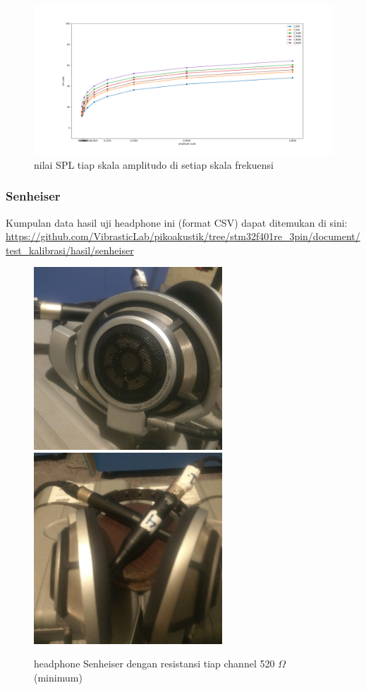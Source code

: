 \documentclass[12pt,]{article}
\begin{document}
	\begin{figure}[!ht]
		\centering
		\includegraphics[width=500pt]{hasil/kenion/maxallfreq/each_freq}
		\caption{nilai SPL tiap skala amplitudo di setiap skala frekuensi}
	\end{figure}

	\subsubsection{Senheiser}
	
	Kumpulan data hasil uji headphone ini (format CSV) dapat ditemukan di sini:\\
	\url{https://github.com/VibrasticLab/pikoakustik/tree/stm32f401re_3pin/document/test_kalibrasi/hasil/senheiser}
	
	\begin{figure}[!ht]
		\centering
		\includegraphics[width=200pt]{hasil/senheiser/senheiser}
		\includegraphics[width=200pt]{hasil/senheiser/senheiser_setup}
		\caption{headphone Senheiser dengan resistansi tiap channel 520 $\Omega$ (minimum)}
	\end{figure}
	
\end{document}
